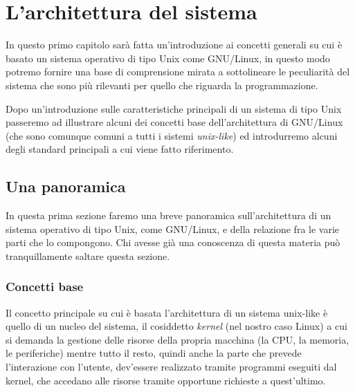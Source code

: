 
\chapter{L'architettura del sistema}
\label{cha:intro_unix}

In questo primo capitolo sarà fatta un'introduzione ai concetti generali su
cui è basato un sistema operativo di tipo Unix come GNU/Linux, in questo modo
potremo fornire una base di comprensione mirata a sottolineare le peculiarità
del sistema che sono più rilevanti per quello che riguarda la programmazione.

Dopo un'introduzione sulle caratteristiche principali di un sistema di tipo
Unix passeremo ad illustrare alcuni dei concetti base dell'architettura di
GNU/Linux (che sono comunque comuni a tutti i sistemi \textit{unix-like}) ed
introdurremo alcuni degli standard principali a cui viene fatto riferimento.


\section{Una panoramica}
\label{sec:intro_unix_struct}

In questa prima sezione faremo una breve panoramica sull'architettura di un
sistema operativo di tipo Unix, come GNU/Linux, e della relazione fra le varie
parti che lo compongono. Chi avesse già una conoscenza di questa materia può
tranquillamente saltare questa sezione.

\subsection{Concetti base}
\label{sec:intro_base_concept}

Il concetto principale su cui è basata l'architettura di un sistema unix-like
è quello di un nucleo del sistema, il cosiddetto \textit{kernel} (nel nostro
caso Linux) a cui si demanda la gestione delle risorse della propria macchina
(la CPU, la memoria, le periferiche) mentre tutto il resto, quindi anche la
parte che prevede l'interazione con l'utente, dev'essere realizzato tramite
programmi eseguiti dal kernel, che accedano alle risorse tramite opportune
richieste a quest'ultimo.

